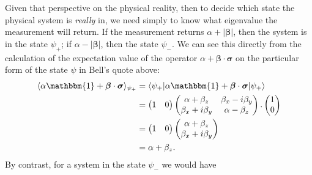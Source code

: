 \documentclass[12pt]{article}
\begin{document}
Given that perspective on the physical reality, then to decide which state the physical system is \emph{really} in, we need simply to know what eigenvalue the measurement will return. If the measurement returns $\alpha + |\bm{\beta}|$, then the system is in the state $\psi_{+}$; if $\alpha - |\bm{\beta}|$, then the state $\psi_{-}$. We can see this directly from the calculation of the expectation value of the operator $\alpha + \bm{\beta} \cdot \bm{\sigma}$ on the particular form of the state $\psi$ in Bell's quote above:
\begin{displaymath}
  \begin{split}
    \langle \alpha \mathbbm{1} + \bm{\beta} \cdot \bm{\sigma} \rangle_{\psi_{+}}
    &= \langle \psi_{+} | \alpha \mathbbm{1} + \bm{\beta} \cdot \bm{\sigma} | \psi_{+} \rangle \\
    &=
    \begin{pmatrix}
      1 & 0
    \end{pmatrix}
    \begin{pmatrix}
      \alpha + \beta_z & \beta_x - i \beta_y \\
      \beta_x + i \beta_y & \alpha - \beta_z
    \end{pmatrix}.
    \begin{pmatrix}
      1 \\
      0
    \end{pmatrix}
    \\
    &=
    \begin{pmatrix}
      1 & 0
    \end{pmatrix}
    \begin{pmatrix}
      \alpha + \beta_z \\
      \beta_x + i\beta_y
    \end{pmatrix}
    \\
    &= \alpha + \beta_z.
  \end{split}
\end{displaymath}
By contrast, for a system in the state $\psi_{-}$ we would have
\end{document}
